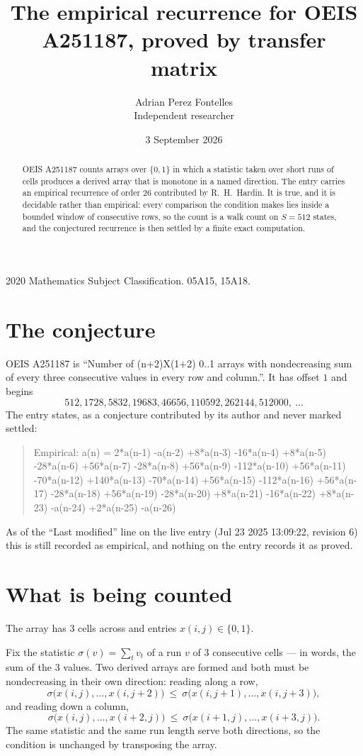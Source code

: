 \documentclass[11pt,a4paper]{article}
\title{The empirical recurrence for OEIS A251187, proved by transfer matrix}
\author{Adrian Perez Fontelles\\ \small Independent researcher}
\date{3 September 2026}
\theoremstyle{plain}
\theoremstyle{definition}
\begin{document}
\maketitle

\begin{abstract}
OEIS A251187 counts arrays over $\{0,1\}$ in which a statistic taken over short runs
of cells produces a derived array that is monotone in a named direction. The entry carries an
empirical recurrence of order $26$ contributed by R.~H.~Hardin. It is true, and it is
decidable rather than empirical: every comparison the condition makes lies inside a bounded
window of consecutive rows, so the count is a walk count on $S=512$ states, and the
conjectured recurrence is then settled by a finite exact computation.
\end{abstract}

\noindent\small 2020 Mathematics Subject Classification. 05A15, 15A18.\normalsize

\section{The conjecture}

OEIS A251187 is ``Number of (n+2)X(1+2) 0..1 arrays with nondecreasing sum of every three consecutive values in every row and column.''. It has offset $1$ and begins
\[
512, 1728, 5832, 19683, 46656, 110592, 262144, 512000,\ \dots
\]
The entry states, as a conjecture contributed by its author and never marked settled:
\begin{quote}
Empirical: a(n) = 2*a(n-1) -a(n-2) +8*a(n-3) -16*a(n-4) +8*a(n-5) -28*a(n-6) +56*a(n-7) -28*a(n-8) +56*a(n-9) -112*a(n-10) +56*a(n-11) -70*a(n-12) +140*a(n-13) -70*a(n-14) +56*a(n-15) -112*a(n-16) +56*a(n-17) -28*a(n-18) +56*a(n-19) -28*a(n-20) +8*a(n-21) -16*a(n-22) +8*a(n-23) -a(n-24) +2*a(n-25) -a(n-26)
\end{quote}
As of the ``Last modified'' line on the live entry (Jul 23 2025 13:09:22, revision 6) this is still
recorded as empirical, and nothing on the entry records it as proved.

\section{What is being counted}

The array has $3$ cells across and entries $x(i,j)\in\{0,1\}$.

Fix the statistic $\sigma(v)=\sum_{t} v_t$ of a run $v$ of $3$ consecutive cells --- in words,
the sum of the $3$ values. Two derived arrays are formed and both must be
nondecreasing in their own direction: reading along a row,
\[
\sigma\bigl(x(i,j),\dots,x(i,j{+}2)\bigr)\ \le\
\sigma\bigl(x(i,j{+}1),\dots,x(i,j{+}3)\bigr),
\]
and reading down a column,
\[
\sigma\bigl(x(i,j),\dots,x(i{+}2,j)\bigr)\ \le\
\sigma\bigl(x(i{+}1,j),\dots,x(i{+}3,j)\bigr).
\]
The same statistic and the same run length serve both directions, so the condition is
unchanged by transposing the array.
\end{document}

